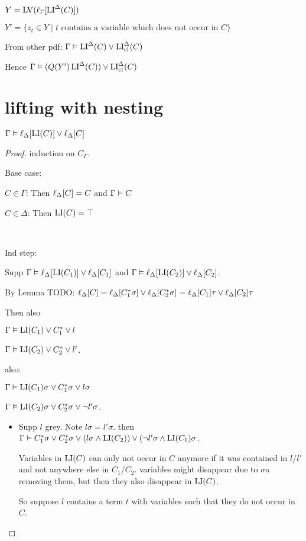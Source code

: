 \documentclass[,%
	draft=false,%
	numbers=noendperiod
	11pt,
	a4paper,
	oneside,%
	openany,
]{memoir}
\begin{document}
$Y = \operatorname{LV}( \ell_{\Gamma}[\operatorname{LI}^\Delta(C)])$

$Y' = \{ z_t \in Y \mid t\text{ contains a variable which does not occur in $C$} \}$

From other pdf: $\Gamma \vDash \operatorname{LI}^\Delta(C) \lor \operatorname{LI}_{\operatorname{cl}}^\Delta(C)$

Hence $\Gamma \vDash (Q(Y') \operatorname{LI}^\Delta(C)) \lor \operatorname{LI}_{\operatorname{cl}}^\Delta(C)$

\section{lifting with nesting}

\begin{clemma}
	$\Gamma \vDash \ell_{\Delta}[\operatorname{LI}(C)] \lor \ell_{\Delta}[C]$
\end{clemma}
\begin{proof}
induction on $C_\Gamma$.

Base case:

$C\in \Gamma$: Then $\ell_{\Delta}[C] = C$ and $\Gamma \vDash C$

$C \in \Delta$: Then $\operatorname{LI}(C) = \top$ 

~

Ind step:

Supp
$\Gamma \vDash \ell_{\Delta}[\operatorname{LI}(C_1)] \lor \ell_{\Delta}[C_1]$ and
$\Gamma \vDash \ell_{\Delta}[\operatorname{LI}(C_2)] \lor \ell_{\Delta}[C_2]$.


By Lemma TODO:
$\ell_{\Delta}[C] = \ell_{\Delta}[C_1^*\sigma] \lor \ell_{\Delta}[C_2^*\sigma] = \ell_{\Delta}[C_1]\tau \lor \ell_{\Delta}[C_2]\tau$

Then also

$\Gamma \vDash \operatorname{LI}(C_1) \lor C_1^* \lor l$

$\Gamma \vDash \operatorname{LI}(C_2) \lor C_2^* \lor l'$.

also:

$\Gamma \vDash \operatorname{LI}(C_1)\sigma \lor C_1^*\sigma \lor l\sigma$

$\Gamma \vDash \operatorname{LI}(C_2)\sigma \lor C_2^*\sigma \lor \lnot l'\sigma$.

\begin{itemize}
	\item Supp $l$ grey.
		Note $l\sigma = l'\sigma$.
		then
		$\Gamma \vDash C_1^*\sigma \lor C_2^*\sigma \lor (l\sigma \land \operatorname{LI}(C_2)) \lor (\lnot l'\sigma \land \operatorname{LI}(C_1)\sigma$.

		Variables in $\operatorname{LI}(C)$ can only not occur in $C$ anymore if it was contained in $l$/$l'$ and not anywhere else in $C_1$/$C_2$.
		variables might disappear due to $\sigma$a removing them, but then they also disappear in $\operatorname{LI}(C)$.

		So suppose $l$ contains a term $t$ with variables such that they do not occur in $C$.
\end{itemize}




	\end{proof}
\end{document}

